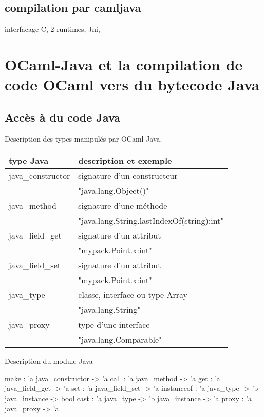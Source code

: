 \documentclass[a4paper, 11pt, notitlepage]{article}
\begin{document}
\subsection{compilation par camljava}
interfacage C, 2 runtimes, Jni, 











\section{OCaml-Java et la compilation de code OCaml vers du bytecode Java}

\subsection{Accès à du code Java}
\noindent
Description des types manipulés par OCaml-Java.  

\begin{tabular}{|l|l|}
  \hline
  type Java & description et exemple \\
  \hline
  java\_constructor & signature d'un constructeur  \\
  &  "java.lang.Object()" \\
  \hline
  java\_method & signature d'une méthode \\
  & "java.lang.String.lastIndexOf(string):int"\\
  \hline
  java\_field\_get & signature d'un attribut\\
  & "mypack.Point.x:int" \\
  \hline
  java\_field\_set & signature d'un attribut\\
  & "mypack.Point.x:int" \\
  \hline
  java\_type & classe, interface ou type Array\\
  & "java.lang.String"\\
  \hline
  java\_proxy & type d'une interface\\
  & "java.lang.Comparable"\\ 
  \hline
\end{tabular}

\noindent
Description du module Java

\begin{OCamlEx}
make : 'a java_constructor -> 'a
call : 'a java_method -> 'a
get : 'a java_field_get -> 'a
set : 'a java_field_set -> 'a
instanceof : 'a java_type -> 'b java_instance -> bool
cast : 'a java_type -> 'b java_instance -> 'a
proxy : 'a java_proxy -> 'a
\end{OCamlEx}
\end{document}
